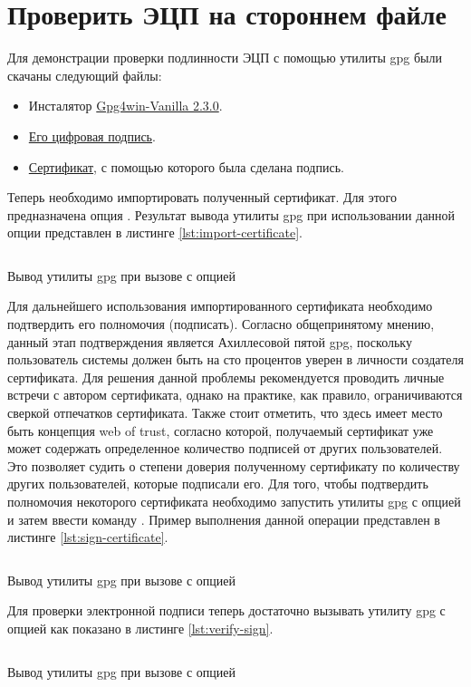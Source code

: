 \section{Проверить ЭЦП на стороннем файле}

Для демонстрации проверки подлинности ЭЦП с помощью утилиты gpg были скачаны следующий файлы:
\begin{itemize}
    \item Инсталятор \href{https://files.gpg4win.org/gpg4win-vanilla-2.3.0.exe}{Gpg4win-Vanilla 2.3.0}.
    \item \href{https://files.gpg4win.org/gpg4win-vanilla-2.3.0.exe.sig}{Его цифровая подпись}.
    \item \href{https://ssl.intevation.de/Intevation-Distribution-Key.asc}{Сертификат}, с помощью которого была сделана подпись.
\end{itemize}
Теперь необходимо импортировать полученный сертификат. Для этого предназначена опция . Результат вывода утилиты gpg
при использовании данной опции представлен в листинге \ref{lst:import-certificate}.

\begin{listing}[H]
    \inputminted{console}{resources/06_import_certificate}
    \caption{Вывод утилиты gpg при вызове с опцией }
    \label{lst:import-certificate}
\end{listing}

Для дальнейшего использования импортированного сертификата необходимо подтвердить его полномочия (подписать). Согласно общепринятому 
мнению, данный этап подтверждения является Ахиллесовой пятой gpg, поскольку пользователь системы должен быть на сто процентов
уверен в личности создателя сертификата. Для решения данной проблемы рекомендуется проводить личные встречи с автором сертификата,
однако на практике, как правило, ограничиваются сверкой отпечатков сертификата. Также стоит отметить, что здесь имеет место быть 
концепция web of trust, согласно которой, получаемый сертификат уже может содержать определенное количество подписей от других 
пользователей. Это позволяет судить о степени доверия полученному сертификату по количеству других пользователей, которые подписали
его. Для того, чтобы подтвердить полномочия некоторого сертификата необходимо запустить утилиты gpg с опцией 
и затем ввести команду . Пример выполнения данной операции представлен в листинге \ref{lst:sign-certificate}.

\begin{listing}[H]
    \inputminted{console}{resources/07_sign_certificate}
    \caption{Вывод утилиты gpg при вызове с опцией }
    \label{lst:sign-certificate}
\end{listing}

Для проверки электронной подписи теперь достаточно вызывать утилиту gpg с опцией  как показано в листинге 
\ref{lst:verify-sign}.

\begin{listing}[H]
    \inputminted{console}{resources/08_verify_sign}
    \caption{Вывод утилиты gpg при вызове с опцией }
    \label{lst:verify-sign}
\end{listing}